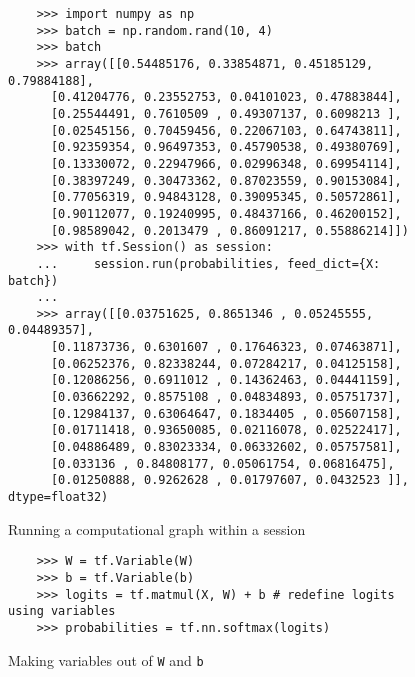 \begin{figure}
  \begin{verbatim}
    >>> import numpy as np
    >>> batch = np.random.rand(10, 4)
    >>> batch
    >>> array([[0.54485176, 0.33854871, 0.45185129, 0.79884188],
      [0.41204776, 0.23552753, 0.04101023, 0.47883844],
      [0.25544491, 0.7610509 , 0.49307137, 0.6098213 ],
      [0.02545156, 0.70459456, 0.22067103, 0.64743811],
      [0.92359354, 0.96497353, 0.45790538, 0.49380769],
      [0.13330072, 0.22947966, 0.02996348, 0.69954114],
      [0.38397249, 0.30473362, 0.87023559, 0.90153084],
      [0.77056319, 0.94843128, 0.39095345, 0.50572861],
      [0.90112077, 0.19240995, 0.48437166, 0.46200152],
      [0.98589042, 0.2013479 , 0.86091217, 0.55886214]])
    >>> with tf.Session() as session:
    ...     session.run(probabilities, feed_dict={X: batch})
    ...
    >>> array([[0.03751625, 0.8651346 , 0.05245555, 0.04489357],
      [0.11873736, 0.6301607 , 0.17646323, 0.07463871],
      [0.06252376, 0.82338244, 0.07284217, 0.04125158],
      [0.12086256, 0.6911012 , 0.14362463, 0.04441159],
      [0.03662292, 0.8575108 , 0.04834893, 0.05751737],
      [0.12984137, 0.63064647, 0.1834405 , 0.05607158],
      [0.01711418, 0.93650085, 0.02116078, 0.02522417],
      [0.04886489, 0.83023334, 0.06332602, 0.05757581],
      [0.033136 , 0.84808177, 0.05061754, 0.06816475],
      [0.01250888, 0.9262628 , 0.01797607, 0.0432523 ]], dtype=float32)
  \end{verbatim}
  \caption{Running a computational graph within a session}
  \label{fig:use-session}
\end{figure}

\begin{figure}
  \begin{verbatim}
    >>> W = tf.Variable(W)
    >>> b = tf.Variable(b)
    >>> logits = tf.matmul(X, W) + b # redefine logits using variables 
    >>> probabilities = tf.nn.softmax(logits)
  \end{verbatim}
  \caption{Making variables out of \texttt{W} and \texttt{b}}
  \label{fig:making-variables}
\end{figure}

